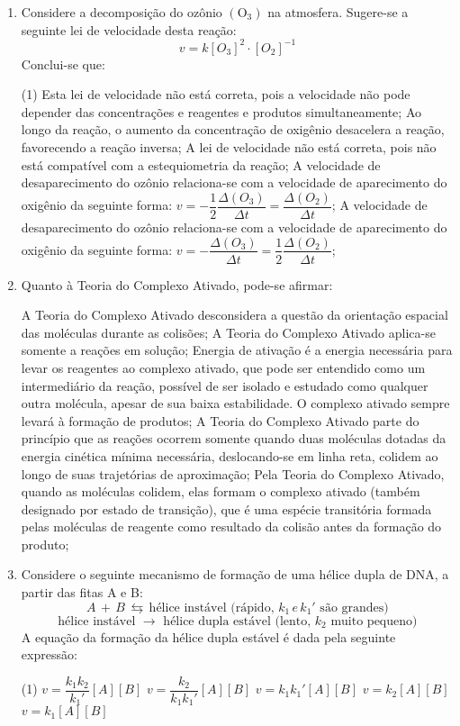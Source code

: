 \documentclass[12pt,a4paper]{article}
\begin{document}
\begin{enumerate}[label=(\roman*)]
\item Considere a decomposição do ozônio $\mathrm{(O_3)}$ na atmosfera. Sugere-se a seguinte lei de velocidade desta reação: $$v=k[O_3]^2\cdot [O_2]^{-1}$$Conclui-se que:
\begin{tasks}(1)
\task Esta lei de velocidade não está correta, pois a velocidade não pode depender das concentrações e reagentes e produtos simultaneamente;
\task Ao longo da reação, o aumento da concentração de oxigênio desacelera a reação, favorecendo a reação inversa;
\task A lei de velocidade não está correta, pois não está compatível com a estequiometria da reação;
\task A velocidade de desaparecimento do ozônio relaciona-se com a velocidade de aparecimento do oxigênio da seguinte forma: $v = -\dfrac{1}{2}\dfrac{\Delta(O_3)}{\Delta t} = \dfrac{\Delta (O_2)}{\Delta t}$;
\task A velocidade de desaparecimento do ozônio relaciona-se com a velocidade de aparecimento do oxigênio da seguinte forma: $v = -\dfrac{\Delta (O_3)}{\Delta t} = \dfrac{1}{2}\dfrac{\Delta (O_2)}{\Delta t}$;
\end{tasks}
\item Quanto à Teoria do Complexo Ativado, pode-se afirmar:
\begin{tasks}
\task A Teoria do Complexo Ativado desconsidera a questão da orientação espacial das moléculas durante as colisões;
\task A Teoria do Complexo Ativado aplica-se somente a reações em solução;
\task Energia de ativação é a energia necessária para levar os reagentes ao complexo ativado, que pode ser entendido como um intermediário da reação, possível de ser isolado e estudado como qualquer outra molécula, apesar de sua baixa estabilidade. O complexo ativado sempre levará à formação de produtos;
\task A Teoria do Complexo Ativado parte do princípio que as reações ocorrem somente quando duas moléculas dotadas da energia cinética mínima necessária, deslocando-se em linha reta, colidem ao longo de suas trajetórias de aproximação;
\task Pela Teoria do Complexo Ativado, quando as moléculas colidem, elas formam o complexo ativado (também designado por estado de transição), que é uma espécie transitória formada pelas moléculas de reagente como resultado da colisão antes da formação do produto;
\end{tasks}
\item Considere o seguinte mecanismo de formação de uma hélice dupla de DNA, a partir das fitas A e B:$$A\,+\, B \, \leftrightarrows \, \text{hélice instável (rápido, }k_1\,e\,k_1'\text{ são grandes)} $$ $$\text{hélice instável }\to \text{ hélice dupla estável (lento, }k_2 \text{ muito pequeno)} $$A equação da formação da hélice dupla estável é dada pela seguinte expressão:
\begin{tasks}(1)
\task $v = \dfrac{k_1k_2}{k_1'}[A][B]$
\task $v = \dfrac{k_2}{k_1k_1'}[A][B]$
\task $v = k_1k_1'[A][B]$
\task $v = k_2[A][B]$
\task $v = k_1[A][B]$
\end{tasks}
\end{enumerate}
\end{document}
